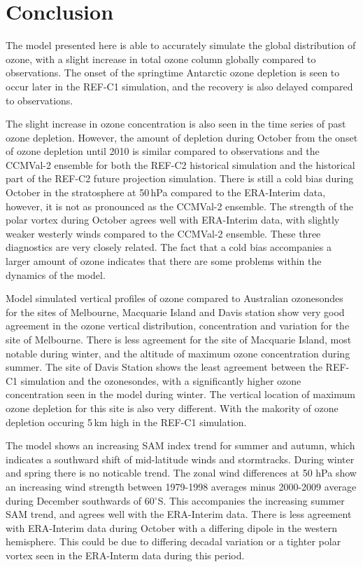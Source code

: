 \section{Conclusion}

The model presented here is able to accurately simulate the global distribution of ozone, with a slight increase in total ozone column globally compared to observations. The onset of the springtime Antarctic ozone depletion is seen to occur later in the REF-C1 simulation, and the recovery is also delayed compared to observations. 

The slight increase in ozone concentration is also seen in the time series of past ozone depletion. However, the amount of depletion during October from the onset of ozone depletion until 2010 is similar compared to observations and the CCMVal-2 ensemble for both the REF-C2 historical simulation and the historical part of the REF-C2 future projection simulation. There is still a cold bias during October in the stratosphere at 50\,hPa compared to the ERA-Interim data, however, it is not as pronounced as the CCMVal-2 ensemble. The strength of the polar vortex during October agrees well with ERA-Interim data, with slightly weaker westerly winds compared to the CCMVal-2 ensemble. These three diagnostics are very closely related. The fact that a cold bias accompanies a larger amount of ozone indicates that there are some problems within the dynamics of the model. 

Model simulated vertical profiles of ozone compared to Australian ozonesondes for the sites of Melbourne, Macquarie Island and Davis station show very good agreement in the ozone vertical distribution, concentration and variation for the site of Melbourne. There is less agreement for the site of Macquarie Island, most notable during winter, and the altitude of maximum ozone concentration during summer. The site of Davis Station shows the least agreement between the REF-C1 simulation and the ozonesondes, with a significantly higher ozone concentration seen in the model during winter. The vertical location of maximum ozone depletion for this site is also very different. With the makority of ozone depletion occuring 5\,km high in the REF-C1 simulation.

The model shows an increasing SAM index trend for summer and autumn, which indicates a southward shift of mid-latitude winds and stormtracks. During winter and spring there is no noticable trend. The zonal wind differences at 50 hPa show an increasing wind strength between 1979-1998 averages minus 2000-2009 average during December southwards of 60$^\circ$S. This accompanies the increasing summer SAM trend, and agrees well with the ERA-Interim data. There is less agreement with ERA-Interim data during October with a differing dipole in the western hemisphere. This could be due to differing decadal variation or a tighter polar vortex seen in the ERA-Interm data during this period.

